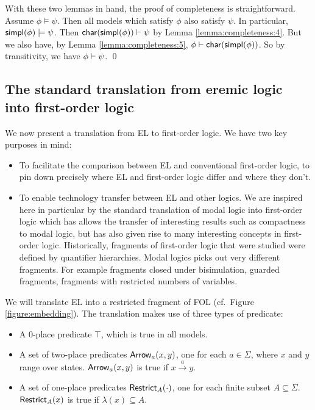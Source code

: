 With these two lemmas in hand, the proof of completeness is
straightforward.  Assume $\phi \models \psi$.  Then all models which satisfy
$\phi$ also satisfy $\psi$.  In particular, $\mathsf{simpl}(\phi) \models \psi$.  Then
$\mathsf{char}(\mathsf{simpl}(\phi)) \vdash \psi$ by Lemma \ref{lemma:completeness:4}.  But we
also have, by Lemma \ref{lemma:completeness:5}, $\phi \vdash
\mathsf{char}(\mathsf{simpl}(\phi)) $.  So by transitivity, we have $\phi \vdash \psi$.  \qed


\subsection{The standard translation from  eremic logic into first-order logic}\label{standardTranslation}

We now present a translation from EL to first-order logic. We have two
key purposes in mind:

\begin{itemize}

\item To facilitate the comparison between EL and conventional
  first-order logic, to pin down precisely where EL and first-order
  logic differ and where they don't.

\item To enable technology transfer between EL and other logics. We
  are inspired here in particular by the standard translation of modal
  logic into first-order logic \cite{BlackburnP:modlog} which has
  allows the transfer of interesting results such as compactness to
  modal logic, but has also given rise to many interesting concepts in
  first-order logic.  Historically, fragments of first-order logic
  that were studied were defined by quantifier hierarchies. Modal
  logics picks out very different fragments. For example fragments
  closed under bisimulation, guarded fragments, fragments with
  restricted numbers of variables.

\end{itemize}



\NI We will translate EL into a restricted fragment of FOL  (cf.~Figure
\ref{figure:embedding}). The translation makes use of three types of
predicate:

\begin{itemize}

\item A 0-place predicate $\top$, which is true in all models.

\item A set of two-place predicates $\mathsf{Arrow}_{a}(x, y)$, one for each $a
  \in \Sigma$, where $x$ and $y$ range over states. $\mathsf{Arrow}_{a}(x, y)$
  is true if $x \xrightarrow{a} y$.

\item A set of one-place predicates $\mathsf{Restrict}_{A}(\cdot)$, one for each finite
  subset $A \subseteq \Sigma$.  $\mathsf{Restrict}_{A}(x)$ is true if
  $\lambda(x) \subseteq A$.

\end{itemize}

